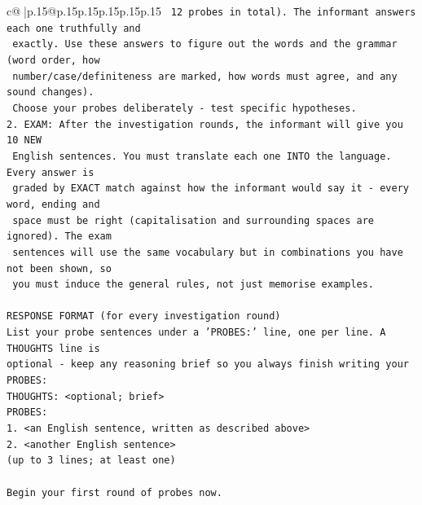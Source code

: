 \documentclass{article}
\begin{document}
{\begin{supertabular}{c@{$\;$}|p{.15\linewidth}@{}p{.15\linewidth}p{.15\linewidth}p{.15\linewidth}p{.15\linewidth}p{.15\linewidth}}
{{{\texttt{   12 probes in total). The informant answers each one truthfully and} \\
\texttt{   exactly. Use these answers to figure out the words and the grammar (word order, how} \\
\texttt{   number/case/definiteness are marked, how words must agree, and any sound changes).} \\
\texttt{   Choose your probes deliberately {-} test specific hypotheses.} \\
\texttt{2. EXAM: After the investigation rounds, the informant will give you 10 NEW} \\
\texttt{   English sentences. You must translate each one INTO the language. Every answer is} \\
\texttt{   graded by EXACT match against how the informant would say it {-} every word, ending and} \\
\texttt{   space must be right (capitalisation and surrounding spaces are ignored). The exam} \\
\texttt{   sentences will use the same vocabulary but in combinations you have not been shown, so} \\
\texttt{   you must induce the general rules, not just memorise examples.} \\
\\ 
\texttt{RESPONSE FORMAT (for every investigation round)} \\
\texttt{List your probe sentences under a 'PROBES:' line, one per line. A THOUGHTS line is} \\
\texttt{optional {-} keep any reasoning brief so you always finish writing your PROBES:} \\
\texttt{THOUGHTS: <optional; brief>} \\
\texttt{PROBES:} \\
\texttt{1. <an English sentence, written as described above>} \\
\texttt{2. <another English sentence>} \\
\texttt{(up to 3 lines; at least one)} \\
\\ 
\texttt{Begin your first round of probes now.} \\
            }
        }
    }
     \\ \\


\end{supertabular}}
\end{document}
